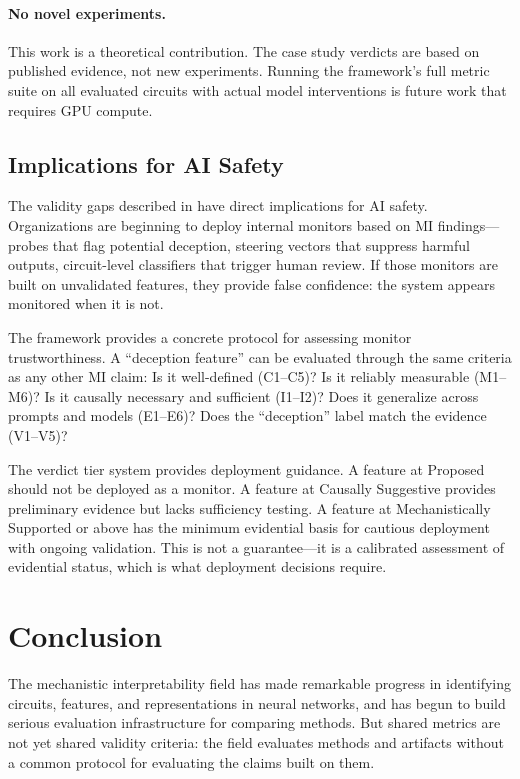 \documentclass[10pt]{article}
\begin{document}
\paragraph{No novel experiments.} This work is a theoretical contribution. The case study verdicts are based on published evidence, not new experiments. Running the framework's full metric suite on all evaluated circuits with actual model interventions is future work that requires GPU compute.

\subsection{Implications for AI Safety}

The validity gaps described in  have direct implications for AI safety. Organizations are beginning to deploy internal monitors based on MI findings---probes that flag potential deception, steering vectors that suppress harmful outputs, circuit-level classifiers that trigger human review. If those monitors are built on unvalidated features, they provide false confidence: the system appears monitored when it is not.

The framework provides a concrete protocol for assessing monitor trustworthiness. A ``deception feature'' can be evaluated through the same criteria as any other MI claim: Is it well-defined (C1--C5)? Is it reliably measurable (M1--M6)? Is it causally necessary and sufficient (I1--I2)? Does it generalize across prompts and models (E1--E6)? Does the ``deception'' label match the evidence (V1--V5)?

The verdict tier system provides deployment guidance. A feature at Proposed should not be deployed as a monitor. A feature at Causally Suggestive provides preliminary evidence but lacks sufficiency testing. A feature at Mechanistically Supported or above has the minimum evidential basis for cautious deployment with ongoing validation. This is not a guarantee---it is a calibrated assessment of evidential status, which is what deployment decisions require.

\section{Conclusion}
\label{sec:conclusion}

The mechanistic interpretability field has made remarkable progress in identifying circuits, features, and representations in neural networks, and has begun to build serious evaluation infrastructure for comparing methods. But shared metrics are not yet shared validity criteria: the field evaluates methods and artifacts without a common protocol for evaluating the claims built on them.
\end{document}
